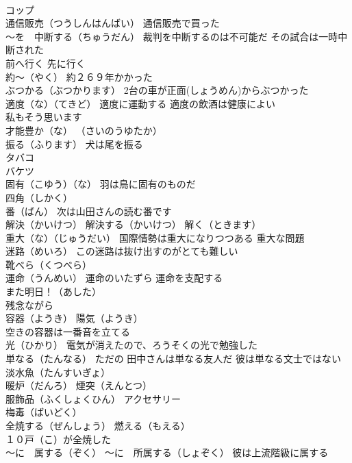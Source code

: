 \documentclass[8pt]{extreport}
\begin{document}
\begin{CJK}{UTF8}{min}
\\	コップ
\\	通信販売（つうしんはんばい） 通信販売で買った
\\	～を　中断する（ちゅうだん） 裁判を中断するのは不可能だ その試合は一時中断された
\\	前へ行く 先に行く
\\	約～（やく） 約２６９年かかった
\\	ぶつかる（ぶつかります） 2台の車が正面(しょうめん)からぶつかった
\\	適度（な）（てきど） 適度に運動する 適度の飲酒は健康によい
\\	私もそう思います
\\	才能豊か（な） （さいのうゆたか）
\\	振る（ふります） 犬は尾を振る
\\	タバコ
\\	バケツ
\\	固有（こゆう）（な） 羽は鳥に固有のものだ
\\	四角（しかく）
\\	番（ばん） 次は山田さんの読む番です
\\	解決（かいけつ） 解決する（かいけつ） 解く（ときます）
\\	重大（な）（じゅうだい） 国際情勢は重大になりつつある 重大な問題
\\	迷路（めいろ） この迷路は抜け出すのがとても難しい
\\	靴べら（くつべら）
\\	運命（うんめい） 運命のいたずら 運命を支配する
\\	また明日！（あした）
\\	残念ながら
\\	容器（ようき） 陽気（ようき）
\\	空きの容器は一番音を立てる
\\	光（ひかり） 電気が消えたので、ろうそくの光で勉強した
\\	単なる（たんなる） ただの 田中さんは単なる友人だ 彼は単なる文士ではない
\\	淡水魚（たんすいぎょ）
\\	暖炉（だんろ） 煙突（えんとつ）
\\	服飾品（ふくしょくひん） アクセサリー
\\	梅毒（ばいどく）
\\	全焼する（ぜんしょう） 燃える（もえる）
\\	１０戸（こ）が全焼した
\\	～に　属する（ぞく） ～に　所属する（しょぞく） 彼は上流階級に属する

\end{CJK}
\end{document}
